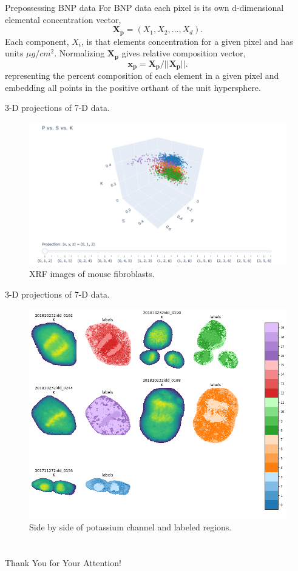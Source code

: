 \documentclass[
]{beamer}
\begin{document}
\begin{frame}{Prepossessing BNP data}
For BNP data each pixel is its own d-dimensional elemental concentration vector, 
$$\boldsymbol{X_p} = (X_1, X_2, ..., X_d).$$
Each component, $X_i$, is that elements concentration for a given pixel and has units $\mu g/cm^2$. Normalizing $\boldsymbol{X_p}$ gives relative composition vector,
$$ \boldsymbol{x_p} = \boldsymbol{X_p}/||\boldsymbol{X_p}||.$$
representing the percent composition of each element in a given pixel and embedding all points in the positive orthant of the unit hypersphere. 
\end{frame}

\begin{frame}{3-D projections of 7-D data.}
\begin{figure}[h]
  \includegraphics[width=1\textwidth,height=1\textheight,keepaspectratio]{7dto3d.png}
  \caption{XRF images of mouse fibroblasts.}
\end{figure}
\end{frame}

\begin{frame}{3-D projections of 7-D data.}
\begin{figure}[h]
  \includegraphics[width=.8\textwidth,height=.7\textheight,keepaspectratio]{labels.png}
  \caption{Side by side of potassium channel and labeled regions.}
\end{figure}
\end{frame}
\section{\bibname}
\begin{frame}[t, allowframebreaks]{\bibname}
\printbibliography[heading=none]
\end{frame}

\begin{frame}[plain]
\vfill
\centerline{Thank You for Your Attention!}
\vfill\vfill
\end{frame}
\end{document}

